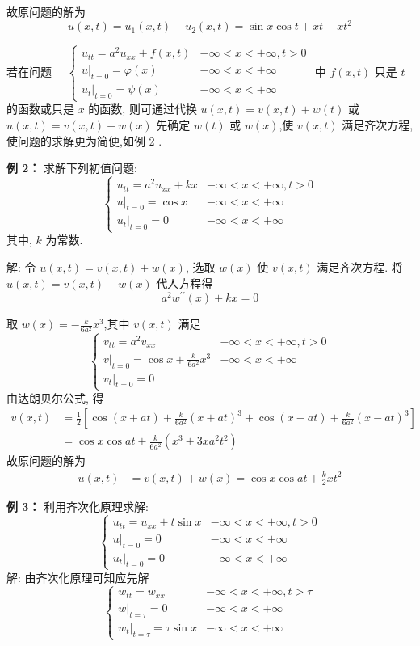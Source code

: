 故原问题的解为
$$
u(x, t) =u_{1}(x, t)+u_{2}(x, t) =\sin x \cos t+x t+x t^{2}
$$

若在问题 $ \quad\left\{\begin{array}{ll}u_{t t}=a^{2} u_{x x}+f(x, t) & -\infty<x<+\infty, t>0 \\ \left.u\right|_{t=0}=\varphi(x) & -\infty<x<+\infty \\ \left.u_{t}\right|_{t=0}=\psi(x) & -\infty<x<+\infty\end{array}\right. $ 中 $ f(x, t) $ 只是 $ t $ 的函数或只是 $ x $ 的函数, 则可通过代换 $ u(x, t)=v(x, t)+w(t) $ 或 $ u(x, t)=v(x, t)+w(x) $ 先确定 $ w(t) $ 或 $ w(x) $,使 $ v(x, t) $ 满足齐次方程,使问题的求解更为简便,如例 2 .

\textbf{例 2：} 求解下列初值问题:
$$
\left\{\begin{array}{ll}
u_{t t}=a^{2} u_{x x}+k x & -\infty<x<+\infty, t>0 \\
\left.u\right|_{t=0}=\cos x & -\infty<x<+\infty \\
\left.u_{t}\right|_{t=0}=0 & -\infty<x<+\infty
\end{array}\right.
$$
其中, $ k $ 为常数.

解: 令 $ u(x, t)=v(x, t)+w(x) $, 选取 $ w(x) $ 使 $ v(x, t) $ 满足齐次方程.
将 $ u(x, t)=v(x, t)+w(x) $ 代人方程得
$$
a^{2} w^{\prime \prime}(x)+k x=0
$$

取 $ w(x)=-\frac{k}{6 a^{2}} x^{3} $,其中
$ v(x, t) $ 满足
$$
\left\{\begin{array}{ll}
v_{t t}=a^{2} v_{x x} & -\infty<x<+\infty, t>0 \\
\left.v\right|_{t=0}=\cos x+\frac{k}{6 a^{2}} x^{3} & -\infty<x<+\infty \\
\left.v_{t}\right|_{t=0}=0 &
\end{array}\right.
$$
由达朗贝尔公式, 得
$$
\begin{aligned}
v(x, t) & =\frac{1}{2}\left[\cos (x+a t)+\frac{k}{6 a^{2}}(x+a t)^{3}+\cos (x-a t)+\frac{k}{6 a^{2}}(x-a t)^{3}\right] \\
& =\cos x \cos a t+\frac{k}{6 a^{2}}\left(x^{3}+3 x a^{2} t^{2}\right)
\end{aligned}
$$
故原问题的解为
$$
\begin{aligned}
u(x, t) & =v(x, t)+w(x)  =\cos x \cos a t+\frac{k}{2} x t^{2}
\end{aligned}
$$

\textbf{例 3： }利用齐次化原理求解:
$$
\left\{\begin{array}{ll}
u_{t t}=u_{x x}+t \sin x & -\infty<x<+\infty, t>0 \\
\left.u\right|_{t=0}=0 & -\infty<x<+\infty \\
\left.u_{t}\right|_{t=0}=0 & -\infty<x<+\infty
\end{array}\right.
$$
解: 由齐次化原理可知应先解
$$
\left\{\begin{array}{ll}
w_{t t}=w_{x x} & -\infty<x<+\infty, t>\tau \\
\left.w\right|_{t=\tau}=0 & -\infty<x<+\infty \\
\left.w_{t}\right|_{t=\tau}=\tau \sin x & -\infty<x<+\infty
\end{array}\right.
$$


